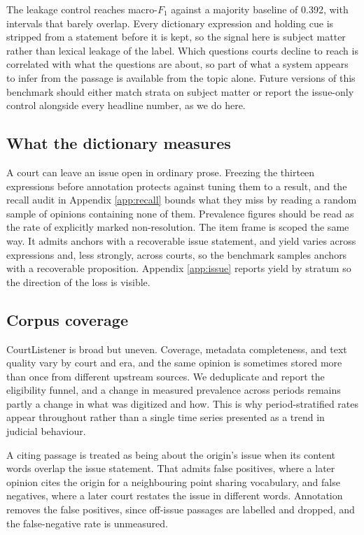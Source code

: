 The leakage control reaches \IssueOnlyF{} macro-$F_1$ against a majority baseline
of 0.392, with intervals that barely overlap. Every dictionary expression and
holding cue is stripped from a statement before it is kept, so the signal here is
subject matter rather than lexical leakage of the label. Which questions courts
decline to reach is correlated with what the questions are about, so part of what
a system appears to infer from the passage is available from the topic alone.
Future versions of this benchmark should either match strata on subject matter or
report the issue-only control alongside every headline number, as we do here.

\subsection*{What the dictionary measures} A court can leave an issue open in
ordinary prose. Freezing the thirteen expressions before annotation protects
against tuning them to a result, and the recall audit in Appendix
\ref{app:recall} bounds what they miss by reading a random sample of opinions
containing none of them. Prevalence figures should be read as the rate of
explicitly marked non-resolution. The item frame is scoped the same way. It
admits anchors with a recoverable issue statement, and yield varies across
expressions and, less strongly, across courts, so the benchmark samples anchors
with a recoverable proposition. Appendix \ref{app:issue} reports yield by
stratum so the direction of the loss is visible.

\subsection*{Corpus coverage} CourtListener is broad but uneven. Coverage,
metadata completeness, and text quality vary by court and era, and the same
opinion is sometimes stored more than once from different upstream sources. We
deduplicate and report the eligibility funnel, and a change in measured
prevalence across periods remains partly a change in what was digitized and how.
This is why period-stratified rates appear throughout rather than a single time
series presented as a trend in judicial behaviour.

A citing passage is treated as being about the origin's issue when its content
words overlap the issue statement. That admits false positives, where a later
opinion cites the origin for a neighbouring point sharing vocabulary, and false
negatives, where a later court restates the issue in different words. Annotation
removes the false positives, since off-issue passages are labelled and dropped,
and the false-negative rate is unmeasured.

